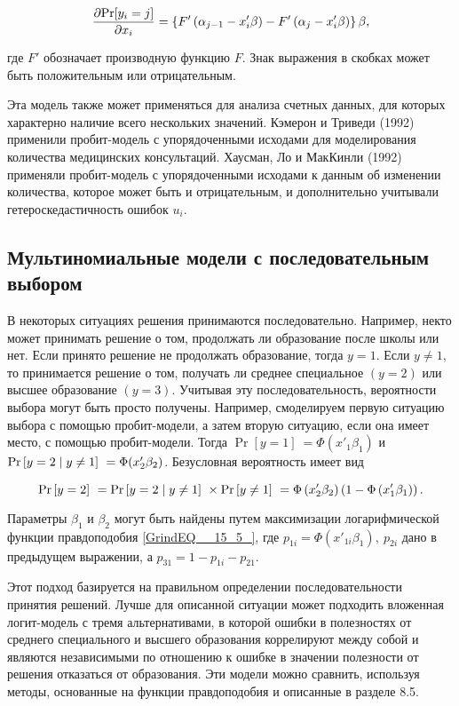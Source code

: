 \[\frac{\partial {\rm Pr}[y_i=j]}{\partial x_i}=\left\{F'\left({\alpha }_{j-1}-x'_i\beta \right)-F'\left({\alpha }_j-x'_i\beta \right)\right\}\beta ,\] 

где $F'$ обозначает производную функцию $F$. Знак выражения в скобках может быть положительным или отрицательным.

Эта модель также может применяться для анализа счетных данных, для которых характерно наличие всего нескольких значений. Кэмерон и Триведи (1992) применили пробит-модель с упорядоченными исходами для моделирования количества медицинских консультаций. Хаусман, Ло и МакКинли (1992) применяли пробит-модель с упорядоченными исходами к данным об изменении количества, которое может быть и отрицательным, и дополнительно учитывали гетероскедастичность ошибок $u_i$.

\subsection{Мультиномиальные модели с последовательным выбором}

В некоторых ситуациях решения принимаются  последовательно. Например, некто может принимать решение о том, продолжать ли образование после школы или нет. Если принято решение не продолжать образование, тогда $y=1$. Если $y\ne 1$, то принимается решение о том, получать ли среднее специальное $\left(y=2\right)$ или высшее образование $\left(y=3\right)$. Учитывая эту последовательность, вероятности выбора могут быть просто получены. Например, смоделируем первую ситуацию выбора с помощью пробит-модели, а затем вторую ситуацию, если она имеет место, с помощью пробит-модели. Тогда ${\Pr  \left[y=1\right]\ }=\Phi (x'_1{\beta }_1)$ и ${\Pr  \left[y=2\mathrel{\left|\vphantom{y=2 y\ne 1}\right.\kern-\nulldelimiterspace}y\ne 1\right]\ }=\Phi (x'_2{\beta }_2)$. Безусловная вероятность имеет вид

\[{\Pr  \left[y=2\right]\ }={\Pr  \left[y=2\mathrel{\left|\vphantom{y=2 y\ne 1}\right.\kern-\nulldelimiterspace}y\ne 1\right]\ }\times {\Pr  \left[y\ne 1\right]\ }=\Phi \left(x'_2{\beta }_2\right)\left(1-\Phi \left(x'_1{\beta }_1\right)\right).\] 

Параметры ${\beta }_1$ и ${\beta }_2$ могут быть найдены путем максимизации логарифмической функции правдоподобия \eqref{GrindEQ__15_5_}, где $p_{1i}=\Phi \left(x'_{1i}{\beta }_1\right),\ p_{2i}$ дано в предыдущем выражении, а $p_{31}=1-p_{1i}-p_{21}$.

Этот подход базируется на правильном определении последовательности принятия решений. Лучше  для описанной ситуации  может подходить вложенная логит-модель с тремя альтернативами, в которой ошибки в полезностях от среднего специального и высшего образования коррелируют между собой и являются независимыми по отношению к ошибке в значении полезности от решения отказаться от образования. Эти модели можно сравнить, используя методы, основанные на  функции правдоподобия и описанные в разделе 8.5. 

